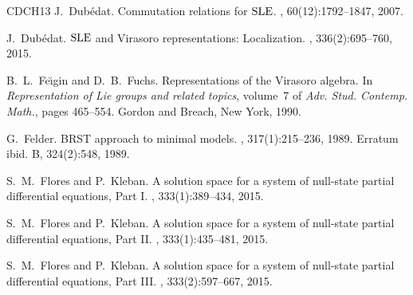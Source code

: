 \documentclass[oneside,english]{amsart}
\numberwithin{equation}{section}
\numberwithin{figure}{section}
\theoremstyle{plain}
\theoremstyle{plain}
\theoremstyle{plain}
\theoremstyle{remark}
\theoremstyle{plain}
\theoremstyle{plain}
\theoremstyle{plain}
\theoremstyle{plain}
\theoremstyle{plain}
\theoremstyle{plain}
\theoremstyle{plain}
\theoremstyle{plain}
\begin{document}
\begin{thebibliography}{CDCH{\etalchar{+}}13}
J.~Dub{\'e}dat.
\newblock Commutation relations for $\mathrm{SLE}$.
, 60(12):1792--1847, 2007.

J.~Dub\'edat.
\newblock $\mathrm{SLE}$ and Virasoro representations: Localization.
, 336(2):695--760, 2015.


B.~L.~Fe{\u\i}gin and D.~B.~Fuchs.
\newblock Representations of the {V}irasoro algebra.
\newblock In {\em Representation of Lie groups and related topics}, volume~7 of
  {\em Adv. Stud. Contemp. Math.}, pages 465--554. Gordon and Breach, New York,
  1990.

G.~Felder.
\newblock B{RST} approach to minimal models.
, 317(1):215--236, 1989.
\newblock Erratum ibid. B, 324(2):548, 1989.



S.~M.~Flores and P.~Kleban.
\newblock A solution space for a system of null-state partial differential
  equations, Part I.
, 333(1):389--434, 2015.

S.~M.~Flores and P.~Kleban.
\newblock A solution space for a system of null-state partial differential
  equations, Part II.
, 333(1):435--481, 2015.

S.~M.~Flores and P.~Kleban.
\newblock A solution space for a system of null-state partial differential
  equations, Part III.
, 333(2):597--667, 2015.


\end{thebibliography}
\end{document}
